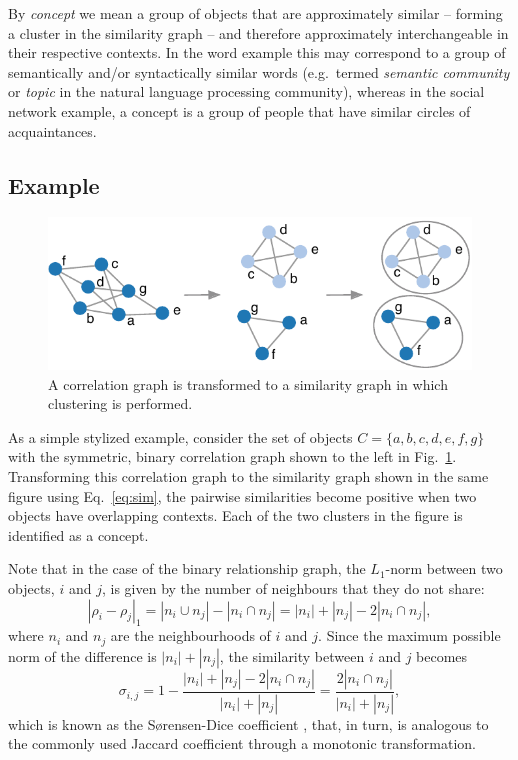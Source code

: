 \documentclass[conference]{IEEEtran}
\newcommand{\rn}[1]{\rho_{#1}}
\newcommand{\sy}[1]{\sigma_{#1}}
\newcommand{\dnm}[2]{|\rn{#1}-\rn{#2}|_1}
\begin{document}
By \emph{concept} we mean a group of objects that are approximately similar -- forming a cluster in 
the similarity graph -- and therefore approximately interchangeable in their respective contexts. In the word example 
this may correspond to a group of semantically and/or syntactically similar words (e.g.\ termed \emph{semantic community} 
or \emph{topic} in the natural language processing community), whereas in the social network example, a concept is a group of 
people that have similar circles of acquaintances.

\subsection{Example}

\begin{figure}
\begin{center}
\includegraphics[width=0.9\columnwidth]{figures/examplegraphs.pdf}
\end{center}
\caption{A correlation graph is transformed to a similarity graph in which clustering is performed.}
\label{fig:examplegraphs}
\end{figure}

As a simple stylized example, consider the set of objects $C = \{a,b,c,d,e,f,g\}$ with the symmetric, binary correlation 
graph shown to the left in Fig.\ \ref{fig:examplegraphs}. Transforming this correlation graph to the similarity graph shown in 
the same figure using Eq.\ \ref{eq:sim}, the pairwise similarities become positive when two objects have overlapping contexts. 
Each of the two clusters in the figure is identified as a concept.

Note that in the case of the binary relationship graph, the $L_1$-norm between two objects, $i$ and $j$, is given by the 
number of neighbours that they do not share:
\begin{equation}
\dnm{i}{j} = |n_i \cup n_j| - |n_i \cap n_j| = |n_i| + |n_j| - 2 |n_i \cap n_j|,
\label{eq:binarynorm}
\end{equation}
where $n_i$ and $n_j$ are the neighbourhoods of $i$ and $j$. Since the maximum possible norm of the difference is $|n_i| + |n_j|$, 
the similarity between $i$ and $j$ becomes
\begin{equation}
\sy{i,j} = 1 - \frac{|n_i| + |n_j| - 2 |n_i \cap n_j|}{|n_i| + |n_j|} = \frac{2 |n_i \cap n_j|}{|n_i| + |n_j|},
\label{eq:binaryrelnorm}
\end{equation}
which is known as the S{\o}rensen-Dice coefficient \cite{Dice45,Sorensen48}, that, in turn, is analogous to the commonly 
used Jaccard coefficient \cite{Jaccard1912} through a monotonic transformation.
\end{document}
